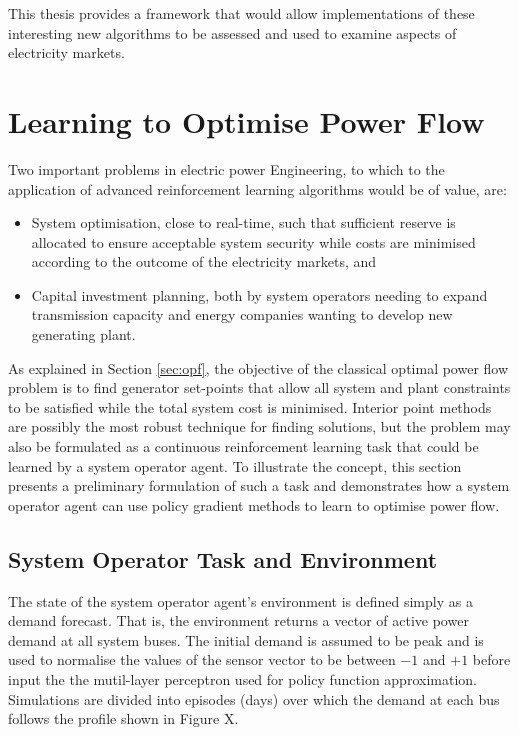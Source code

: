 This thesis provides a framework that would allow implementations of these
interesting new algorithms to be assessed and used to examine aspects of
electricity markets.

\section{Learning to Optimise Power Flow}
Two important problems in electric power Engineering, to which to the
application of advanced reinforcement learning algorithms would be of value,
are:
\begin{itemize}
  \item System optimisation, close to real-time, such that sufficient reserve
  is allocated to ensure acceptable system security while costs are minimised
  according to the outcome of the electricity markets, and
  \item Capital investment planning, both by system operators needing to expand
  transmission capacity and energy companies wanting to develop new generating
  plant.
\end{itemize}


As explained in Section \ref{sec:opf}, the objective of the classical optimal
power flow problem is to find generator set-points that allow all system and
plant constraints to be satisfied while the total system cost is minimised.
Interior point methods are possibly the most robust technique for finding
solutions, but the problem may also be formulated as a continuous
reinforcement learning task that could be learned by a system operator agent.
To illustrate the concept, this section presents a preliminary formulation of
such a task and demonstrates how a system operator agent can use policy
gradient methods to learn to optimise power flow.

\subsection{System Operator Task and Environment}
The state of the system operator agent's environment is defined simply as a
demand forecast.  That is, the environment returns a vector of active power
demand at all system buses.  The initial demand is assumed to be peak and is
used to normalise the values of the sensor vector to be between $-1$ and $+1$
before input the the mutil-layer perceptron used for policy function
approximation.  Simulations are divided into episodes (days) over which the
demand at each bus follows the profile shown in Figure X.

